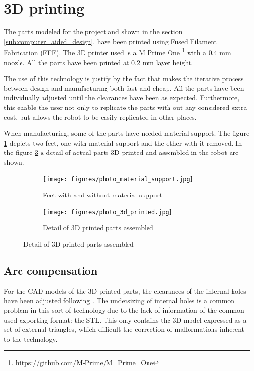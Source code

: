 \section{3D printing} %
\label{sec:3d_printing}
The parts modeled for the project and shown in the section \ref{sub:computer_aided_design}, have been printed using Fused Filament Fabrication (FFF).
The 3D printer used is a M Prime One \footnote{https://github.com/M-Prime/M_Prime_One} with a 0.4 mm noozle.
All the parts have been printed at 0.2 mm layer height.

The use of this technology is justify by the fact that makes the iterative process between design and manufacturing both fast and cheap.
All the parts have been individually adjusted until the clearances have been as expected.
Furthermore, this enable the user not only to replicate the parts with out any considered extra cost, but allows the robot to be easily replicated in other places.

When manufacturing, some of the parts have needed material support.
The figure \ref{fig:photo_material_support} depicts two feet, one with material support and the other with it removed.
In the figure \ref{fig:photo_3d_printed} a detail of actual parts 3D printed and assembled in the robot are shown.

\begin{figure}[ht]
    \centering
    \begin{subfigure}[b]{0.49\textwidth}
        \texttt{[image: figures/photo\_material\_support.jpg]}
        \caption{Feet with and without material support}
        \label{fig:photo_material_support}
    \end{subfigure}
    \begin{subfigure}[b]{0.49\textwidth}
        \texttt{[image: figures/photo\_3d\_printed.jpg]}
        \caption{Detail of 3D printed parts assembled}
        \label{fig:photo_3d_printed}
    \end{subfigure}
\end{figure}

  \subsection{Arc compensation} %
  \label{sub:arc_compensation}
  For the CAD models of the 3D printed parts, the clearances of the internal holes have been adjusted following \cite{arc_compensation}.
  The undersizing of internal holes is a common problem in this sort of technology due to the lack of information of the common-used exporting format: the STL.
  This only contains the 3D model expressed as a set of external triangles, which difficult the correction of malformations inherent to the technology.


